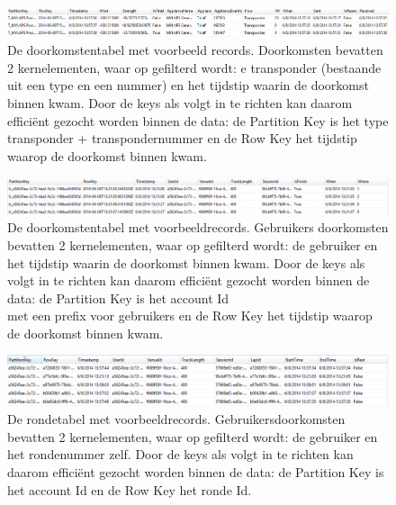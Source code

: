 \begin{figure}[h!]
  \begin{center}
  \includegraphics[width=\textwidth]{style/images/passingsStructure}    
  \end{center}
  \caption{De doorkomstentabel met voorbeeld records. Doorkomsten bevatten 2 kernelementen, waar op gefilterd wordt: e transponder (bestaande uit een type en een nummer) en het tijdstip waarin de doorkomst binnen kwam. Door de keys als volgt in te richten kan daarom efficiënt gezocht worden binnen de data: de Partition Key is het type transponder + transpondernummer en de Row Key het tijdstip waarop de doorkomst binnen kwam.}
  \label{fig:passingTableStructure}
\end{figure}

\begin{figure}[h!]
  \begin{center}
  \includegraphics[width=\textwidth]{style/images/userPassingsStructure}    
  \end{center}
  \caption{De doorkomstentabel met voorbeeldrecords. Gebruikers doorkomsten bevatten 2 kernelementen, waar op gefilterd wordt: de gebruiker en het tijdstip waarin de doorkomst binnen kwam. Door de keys als volgt in te richten kan daarom efficiënt gezocht worden binnen de data: de Partition Key is het account Id \\met een prefix voor gebruikers en de Row Key het tijdstip waarop de doorkomst binnen kwam.}
  \label{fig:userPassingTableStructure}
\end{figure}

\begin{figure}[h!]
  \begin{center}
  \includegraphics[width=\textwidth]{style/images/aggregationLapsStructure}    
  \end{center}
  \caption{De rondetabel met voorbeeldrecords. Gebruikersdoorkomsten bevatten 2 kernelementen, waar op gefilterd wordt: de gebruiker en het rondenummer zelf. Door de keys als volgt in te richten kan daarom efficiënt gezocht worden binnen de data: de Partition Key is het account Id en de Row Key het ronde Id.}
  \label{fig:lapTableStructure}
\end{figure}

